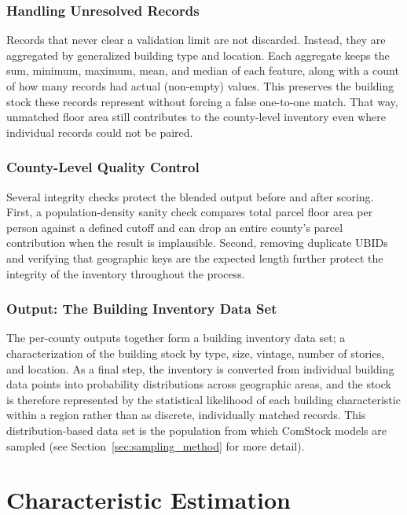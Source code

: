 \subsubsection{Handling Unresolved Records}

Records that never clear a validation limit are not discarded. Instead, they are aggregated by generalized building type and location. Each aggregate keeps the sum, minimum, maximum, mean, and median of each feature, along with a count of how many records had actual (non-empty) values. This preserves the building stock these records represent without forcing a false one-to-one match. That way, unmatched floor area still contributes to the county-level inventory even where individual records could not be paired.

\subsubsection{County-Level Quality Control}

Several integrity checks protect the blended output before and after scoring. First, a population-density sanity check compares total parcel floor area per person against a defined cutoff and can drop an entire county's parcel contribution when the result is implausible. Second, removing duplicate UBIDs and verifying that geographic keys are the expected length further protect the integrity of the inventory throughout the process.

\subsubsection{Output: The Building Inventory Data Set}

The per-county outputs together form a building inventory data set; a characterization of the building stock by type, size, vintage, number of stories, and location. As a final step, the inventory is converted from individual building data points into probability distributions across geographic areas, and the stock is therefore represented by the statistical likelihood of each building characteristic within a region rather than as discrete, individually matched records. This distribution-based data set is
the population from which ComStock models are sampled (see Section~\ref{sec:sampling_method} for more detail).

\section{Characteristic Estimation} \label{Characteristic Estimation}

